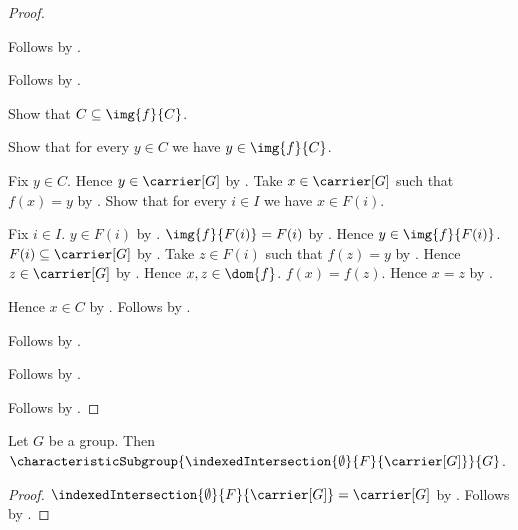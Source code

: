 \begin{proof}
\begin{subproof}
\begin{subproof}
\begin{subproof}
                Follows by .
            \end{subproof}
            Follows by .
        \end{subproof}
        Show that $C\subseteq\img{f}{C}$.
        \begin{subproof}
            Show that for every $y\in C$ we have $y\in\img{f}{C}$.
            \begin{subproof}
                Fix $y\in C$.
                Hence $y\in\carrier[G]$ by .
                Take $x\in\carrier[G]$ such that $f(x)=y$ by
                    .
                Show that for every $i\in I$ we have $x\in F(i)$.
                \begin{subproof}
                    Fix $i\in I$.
                    $y\in F(i)$ by
                        .
                    $\img{f}{F(i)}=F(i)$ by
                        .
                    Hence $y\in\img{f}{F(i)}$.
                    $F(i)\subseteq\carrier[G]$ by
                        .
                    Take $z\in F(i)$ such that $f(z)=y$ by
                        .
                    Hence $z\in\carrier[G]$ by .
                    Hence $x,z\in\dom{f}$.
                    $f(x)=f(z)$.
                    Hence $x=z$ by .
                \end{subproof}
                Hence $x\in C$ by
                    .
                Follows by .
            \end{subproof}
            Follows by .
        \end{subproof}
        Follows by .
    \end{subproof}
    Follows by .
\end{proof}

\begin{corollary}\label{empty_indexed_intersection_characteristic_subgroup}
    Let $G$ be a group.
    Then
        $\characteristicSubgroup
            {\indexedIntersection{\emptyset}{F}{\carrier[G]}}{G}$.
\end{corollary}
\begin{proof}
    $\indexedIntersection{\emptyset}{F}{\carrier[G]}=
        \carrier[G]$ by
        .
    Follows by .
\end{proof}


